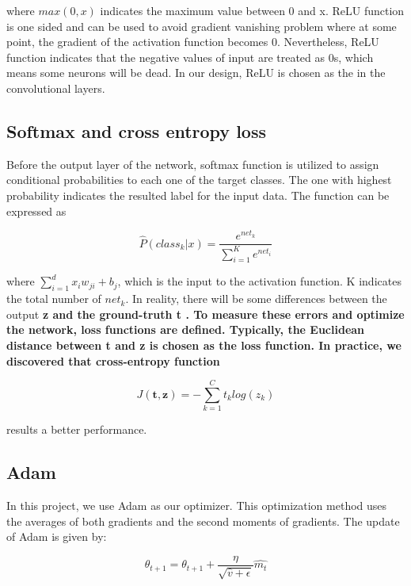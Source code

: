 \documentclass[twoside,twocolumn,10.8pt]{article}
\begin{document}
\noindent where $max(0,x)$ indicates the maximum value between 0 and x. ReLU function is one sided and can be used to avoid gradient vanishing problem where at some point, the gradient of the activation function becomes 0. Nevertheless, ReLU function indicates that the negative values of input are treated as 0s, which means some neurons will be dead. In our design, ReLU is chosen as the in the convolutional layers. \cite{R3}

\subsection{Softmax and cross entropy loss}

Before the output layer of the network, softmax function is utilized to assign conditional probabilities to each one of 
the target classes. The one with highest probability indicates the resulted label for the input data. The function can be expressed as 

\begin{equation}
\label{eq:2}
\widehat{P}(class_{k}|x)=\frac{e^{net_k}}{\sum_{i=1}^{K}e^{net_i}}
\end{equation}

\noindent where $\sum_{i=1}^{d}x_iw_{ji}+b_j$, which is the input to the activation function. K indicates the total number of $net_k$. In reality, there will be some differences between the output \bf z \rm and the ground-truth \bf t \rm. To measure these errors and optimize the network, loss functions are defined. Typically, the Euclidean distance between \bf t \rm and \bf z \rm is chosen as the loss function. In practice, we discovered that cross-entropy function 

\begin{equation}
\label{eq:3}
J(\mathbf{t,z})=-\sum_{k=1}^{C}t_klog(z_k)
\end{equation}

\noindent results a better performance. \cite{R3}

\subsection{Adam}

In this project, we use Adam as our optimizer.  This optimization method uses the averages of both gradients and the second moments of gradients. The update of Adam is given by: 

\begin{equation}
\label{eq:4}
\theta _{t+1}=\theta_{t+1}+\frac{\eta}{\sqrt{\hat{v}+\epsilon }}\widehat{m_t}
\end{equation}
\end{document}
